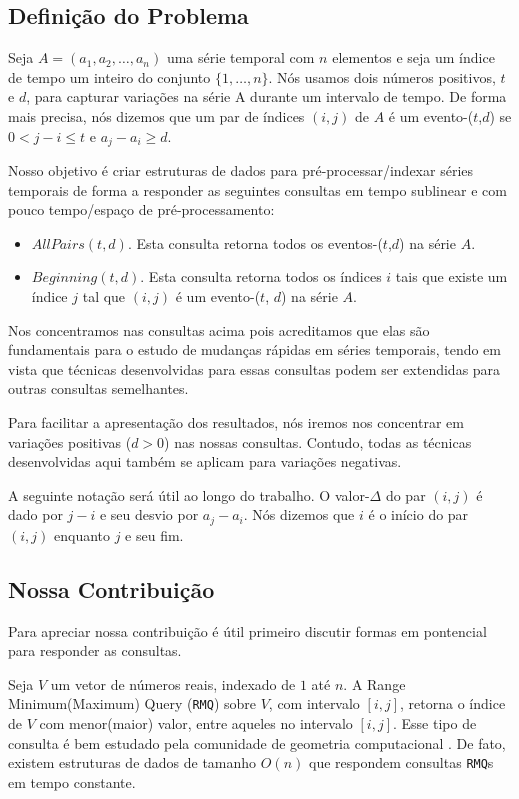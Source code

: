 \documentclass[12pt]{article}
\begin{document}
\subsection{Definição do Problema}

Seja $A = (a_1, a_2, \ldots, a_n)$ uma série temporal com $n$ elementos
e seja um índice de tempo um inteiro do conjunto $\{1, \ldots, n\}$. Nós
usamos dois números positivos, $t$ e $d$, para capturar variações na série
A durante um intervalo de tempo. De forma mais precisa, nós dizemos que um
par de índices $(i,j)$ de $A$ é um evento-($t$,$d$) se $0<j - i \le t$ e $a_j - a_i \ge d$.

Nosso objetivo é criar estruturas de dados para pré-processar/indexar séries temporais
de forma a responder as seguintes consultas em tempo sublinear e com pouco tempo/espaço
de pré-processamento:

\begin{itemize}
\item $AllPairs(t, d)$. Esta consulta retorna todos os eventos-($t$,$d$) na série $A$.
\item $Beginning(t, d)$. Esta consulta retorna todos os índices $i$ tais que existe um
índice $j$ tal que $(i,j)$ é um evento-($t$, $d$) na série $A$.
\end{itemize}

Nos concentramos nas consultas acima pois acreditamos que elas são fundamentais
para o estudo de mudanças rápidas em séries temporais, tendo em vista que 
técnicas desenvolvidas para essas consultas podem ser extendidas para outras
consultas semelhantes.

Para facilitar a apresentação dos resultados, nós iremos nos concentrar
em variações positivas ($d > 0$) nas nossas consultas. Contudo, todas as técnicas
desenvolvidas aqui também se aplicam para variações negativas.

A seguinte notação será útil ao longo do trabalho. O valor-$\Delta$ do par $(i, j)$
é dado por $j - i$ e seu desvio por $a_j - a_i$. Nós dizemos que $i$ é o início
do par $(i, j)$ enquanto $j$ e seu fim.

\subsection{Nossa Contribuição}

Para apreciar nossa contribuição é útil primeiro discutir formas
em pontencial para responder as consultas.

Seja $V$ um vetor de números reais, indexado de $1$ até $n$. A Range
Minimum(Maximum) Query (\verb|RMQ|) sobre $V$, com intervalo $[i,j]$, retorna
o índice de $V$ com menor(maior) valor, entre aqueles no intervalo $[i,j]$.
Esse tipo de consulta é bem estudado pela comunidade de geometria computacional
\cite{lala}. De fato, existem estruturas de dados de tamanho $O(n)$ que respondem
consultas \verb|RMQ|s em tempo constante.
\end{document}
